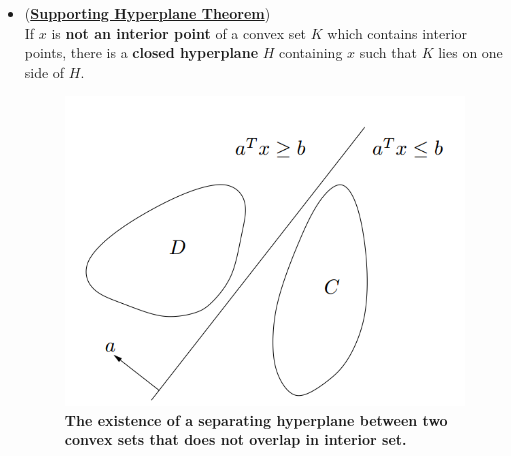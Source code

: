 \documentclass[11pt]{article}
\begin{document}
\begin{itemize}
\item \begin{theorem} (\underline{\textbf{Supporting Hyperplane Theorem}}) \citep{luenberger1997optimization, rockafellar1970convex} \\
If $x$ is \textbf{not an interior point} of a convex set $K$ which contains interior points, there is a \textbf{closed hyperplane} $H$ containing $x$ such that $K$ lies on one side of $H$.
\end{theorem}


\begin{figure}
\begin{minipage}[t]{1\linewidth}
  \centering
  \centerline{\includegraphics[scale = 0.4]{separating_hyperplane_theorem.png}}
\end{minipage}
\caption{\footnotesize{\textbf{The existence of a separating hyperplane between two convex sets that does not overlap in interior set. \citep{boyd2004convex}}}}
\label{fig: separating_hyperplane_theorem}
\end{figure}



\end{itemize}
\end{document}

